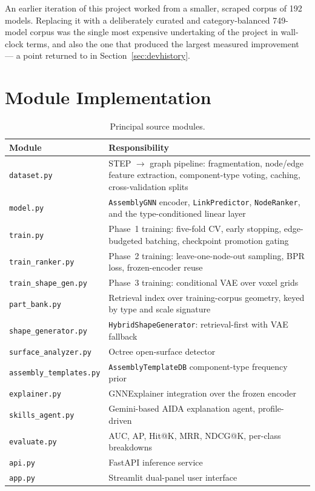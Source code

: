 \documentclass[12pt,oneside,a4paper]{report}
\begin{document}
An earlier iteration of this project worked from a smaller, scraped corpus of
192 models. Replacing it with a deliberately curated and category-balanced
749-model corpus was the single most expensive undertaking of the project in
wall-clock terms, and also the one that produced the largest measured
improvement --- a point returned to in Section~\ref{sec:devhistory}.

\section{Module Implementation}

\begin{table}[h]
\centering
\caption{Principal source modules.}
\label{tab:modules}
\small
\begin{tabularx}{\textwidth}{@{}L{4.1cm}X@{}}
\toprule
\textbf{Module} & \textbf{Responsibility} \\
\midrule
\texttt{dataset.py} & STEP $\to$ graph pipeline: fragmentation, node/edge feature extraction, component-type voting, caching, cross-validation splits \\
\texttt{model.py} & \texttt{AssemblyGNN} encoder, \texttt{LinkPredictor}, \texttt{NodeRanker}, and the type-conditioned linear layer \\
\texttt{train.py} & Phase~1 training: five-fold CV, early stopping, edge-budgeted batching, checkpoint promotion gating \\
\texttt{train\_ranker.py} & Phase~2 training: leave-one-node-out sampling, BPR loss, frozen-encoder reuse \\
\texttt{train\_shape\_gen.py} & Phase~3 training: conditional VAE over voxel grids \\
\texttt{part\_bank.py} & Retrieval index over training-corpus geometry, keyed by type and scale signature \\
\texttt{shape\_generator.py} & \texttt{HybridShapeGenerator}: retrieval-first with VAE fallback \\
\texttt{surface\_analyzer.py} & Octree open-surface detector \\
\texttt{assembly\_templates.py} & \texttt{AssemblyTemplateDB} component-type frequency prior \\
\texttt{explainer.py} & GNNExplainer integration over the frozen encoder \\
\texttt{skills\_agent.py} & Gemini-based AIDA explanation agent, profile-driven \\
\texttt{evaluate.py} & AUC, AP, Hit@K, MRR, NDCG@K, per-class breakdowns \\
\texttt{api.py} & FastAPI inference service \\
\texttt{app.py} & Streamlit dual-panel user interface \\
\bottomrule
\end{tabularx}
\end{table}
\end{document}
